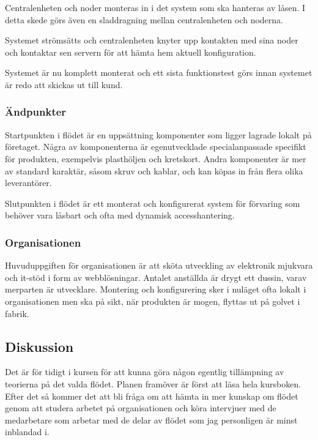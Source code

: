 \documentclass{article}
\begin{document}
Centralenheten och noder monteras in i det system som ska hanteras av låsen. I detta skede görs även en sladdragning mellan centralenheten och noderna.

Systemet strömsätts och centralenheten knyter upp kontakten med sina noder och  kontaktar sen servern för att hämta hem aktuell konfiguration.

Systemet är nu komplett monterat och ett sista funktionstest görs innan systemet är redo att skickas ut till kund.

\subsubsection*{Ändpunkter}
Startpunkten i flödet är en uppsättning komponenter som ligger lagrade lokalt på företaget. Några av komponenterna är egenutvecklade specialanpassade specifikt för produkten, exempelvis plasthöljen och kretskort. Andra komponenter är mer av standard karaktär, såsom skruv och kablar, och kan köpas in från flera olika leverantörer.

Slutpunkten i flödet är ett monterat och konfigurerat system för förvaring som behöver vara låsbart och ofta med dynamisk accesshantering.

\subsubsection*{Organisationen} 
Huvuduppgiften för organisationen är att sköta utveckling av elektronik mjukvara och it-stöd i form av webblösningar. Antalet anställda är drygt ett dussin, varav merparten är utvecklare. Montering och konfigurering sker i nuläget ofta lokalt i organisationen men ska på sikt, när produkten är mogen, flyttas ut på golvet i fabrik.

\subsection*{Diskussion}
Det är för tidigt i kursen för att kunna göra någon egentlig tillämpning av teorierna på det valda flödet. Planen framöver är först att läsa hela kursboken. Efter det så kommer det att bli fråga om att hämta in mer kunskap om flödet genom att studera arbetet på organisationen och köra intervjuer med de medarbetare som arbetar med de delar av flödet som jag personligen är minst inblandad i.
\end{document}
